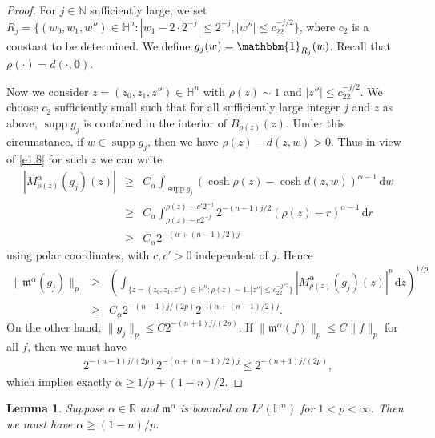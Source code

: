 \documentclass[11pt]{amsproc}
\newcommand{\R}{\mathbb{R}}
\newcommand{\indicator}{\mathbbm{1}}
\newcommand{\supp}{\mathop{\mathrm{supp}}}
\newcommand{\fm}{\mathfrak{m}}
\newcommand{\0}{\mathbf{0}}
\renewcommand{\H}{\mathbb{H}}
\renewcommand{\d}{\mathrm{d}}
\numberwithin{equation}{section}
\numberwithin{figure}{section}
\newtheorem{lem}[thm]{Lemma}
\theoremstyle{definition}
\theoremstyle{remark}
\numberwithin{thm}{section}
\begin{document}
\begin{proof}
For $j\in {\mathbb N}$ sufficiently large, we set $R_j=\{(w_0,w_1,w'')\in\H^n:|w_1-2\cdot2^{-j}|\leq 2^{-j},|w''|\leq c_22^{-j/2}\}$, where $c_2$ is a constant to be determined. We define $g_j(w)=\indicator_{R_j}(w)$. Recall that $\rho(\cdot)=d(\cdot,\0)$.

Now we consider $z=(z_0,z_1,z'')\in\H^n$ with $\rho(z)\sim 1$ and $|z''|\leq c_22^{-j/2}$. We choose $c_2$ sufficiently small such that for all sufficiently large integer $j$ and $z$ as above, $\supp g_j$ is contained in the interior of $B_{\rho(z)}(z)$. Under this circumstance, if $w\in \supp g_j$, then we have $\rho(z)-d(z,w)>0$. Thus in view of \eqref{e1.8} for such $z$ we can write
\begin{eqnarray*}
|M^\alpha_{\rho(z)}(g_j)(z)|&\geq &C_\alpha\int_{\supp g_j}(\cosh \rho(z)-\cosh d(z,w))^{\alpha-1}\,\d w\\
&\geq &C_\alpha\int_{\rho(z)-c2^{-j}}^{\rho(z)-c'2^{-j}}2^{-(n-1)j/2}(\rho(z)-r)^{\alpha-1}\,\d r\\
&\geq &C_\alpha2^{-(\alpha+(n-1)/2)j}
\end{eqnarray*}
using polar coordinates, with $c,c'>0$ independent of $j$. Hence
\begin{eqnarray*}
\|\fm^\alpha(g_j)\|_p&\geq &\left(\int_{\{z=(z_0,z_1,z'')\in\H^n:\rho(z)\sim1,|z''|\leq c_22^{-j/2}\}}|M^\alpha_{\rho(z)}(g_j)(z)|^p\,\d z\right)^{1/p}\\
&\geq &C_\alpha2^{-(n-1)j/(2p)}2^{-(\alpha+(n-1)/2)j}.
\end{eqnarray*}
On the other hand, $\|g_j\|_p\leq C2^{-(n+1)j/(2p)}$. If $\|\fm^\alpha(f)\|_p\leq C\|f\|_p$ for all $f$, then we must have
\begin{eqnarray*}
2^{-(n-1)j/(2p)}2^{-(\alpha+(n-1)/2)j}\leq 2^{-(n+1)j/(2p)},
\end{eqnarray*}
which implies exactly $\alpha\geq1/p+(1-n)/2$.
\end{proof}

\begin{lem}\label{le4.3} 	Suppose $\alpha\in\R$ and $\fm^\alpha$ is bounded on $L^p(\H^n)$ for $1<p
<\infty$.
Then   we must have $\alpha\geq(1-n)/p$.
\end{lem}
\end{document}
